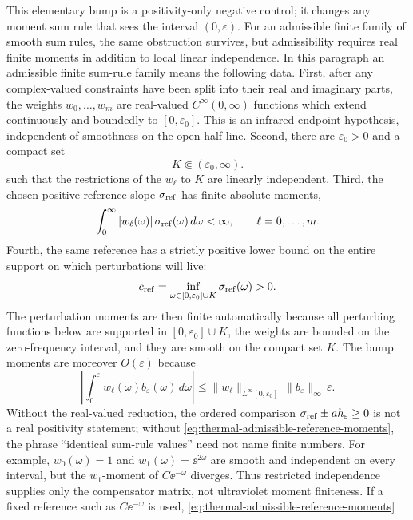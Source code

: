 This elementary bump is a positivity-only negative control; it changes any
moment sum rule that sees the interval \((0,\varepsilon)\).  For an admissible
finite family of smooth sum rules, the same obstruction survives, but
admissibility requires real finite moments in addition to local linear
independence.  In this paragraph an admissible finite sum-rule family
means the following data.  First, after any complex-valued constraints have been
split into their real and imaginary parts, the weights
\(w_0,\ldots,w_m\) are real-valued \(C^\infty(0,\infty)\) functions which
extend continuously and boundedly to \([0,\varepsilon_0]\).  This is an
infrared endpoint hypothesis, independent of smoothness on the open half-line.
Second, there are \(\varepsilon_0>0\) and a compact set
\[
  K\Subset(\varepsilon_0,\infty).
\]
such that the restrictions of the \(w_\ell\) to \(K\) are linearly independent.
Third, the chosen positive reference slope \(\sigma_{\rm ref}\) has finite
absolute moments,
\begin{equation}
  \int_0^\infty |w_\ell(\omega)|\,\sigma_{\rm ref}(\omega)\,d\omega<\infty,
  \qquad \ell=0,\ldots,m .
  \label{eq:thermal-admissible-reference-moments}
\end{equation}
Fourth, the same reference has a strictly positive lower bound on the entire
support on which perturbations will live:
\[
  c_{\rm ref}
  =
  \inf_{\omega\in[0,\varepsilon_0]\cup K}\sigma_{\rm ref}(\omega)
  >
  0 .
\]
The perturbation moments are then finite automatically because all perturbing
functions below are supported in \([0,\varepsilon_0]\cup K\), the weights are
bounded on the zero-frequency interval, and they are smooth on the compact
set \(K\).  The bump moments are moreover \(O(\varepsilon)\) because
\[
  \left|
  \int_0^\varepsilon w_\ell(\omega)b_\varepsilon(\omega)\,d\omega
  \right|
  \le
  \|w_\ell\|_{L^\infty[0,\varepsilon_0]}\,
  \|b_\varepsilon\|_\infty\,\varepsilon .
\]
Without the real-valued reduction, the ordered comparison
\(\sigma_{\rm ref}\pm a h_\varepsilon\ge0\) is not a real positivity statement;
without \eqref{eq:thermal-admissible-reference-moments}, the phrase
``identical sum-rule values'' need not name finite numbers.  For example,
\(w_0(\omega)=1\) and \(w_1(\omega)=\ee^{2\omega}\) are smooth and independent
on every interval, but the \(w_1\)-moment of \(C\ee^{-\omega}\) diverges.
Thus restricted independence supplies only the compensator matrix, not
ultraviolet moment finiteness.  If a fixed reference such as
\(C\ee^{-\omega}\) is used, \eqref{eq:thermal-admissible-reference-moments}
